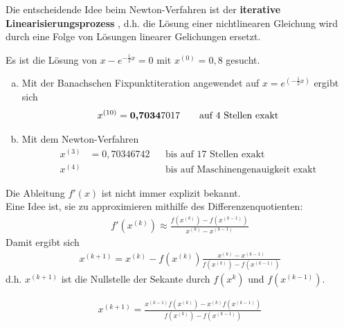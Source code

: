 Die entscheidende Idee beim Newton-Verfahren ist der \textbf{iterative Linearisierungsprozess}
, d.h. die Lösung einer nichtlinearen Gleichung wird
durch eine Folge von Lösungen linearer Gelichungen ersetzt.

\begin{Bspe}
  \label{5.4.6}
  Es ist die Lösung von $x-e^{-\frac{1}{2}x}=0$ mit $x^{(0)}=0,8$ gesucht.
  \begin{enumerate}[a)]
  \item Mit der Banachschen Fixpunktiteration angewendet auf 
    $x=e^{(-\frac{1}{2}x)}$ ergibt sich
    \begin{gather*}
      x^{(10)}=\text{\textbf{0,7034}}7017 
      \qquad \text{auf 4 Stellen exakt}
    \end{gather*}
  \item Mit dem Newton-Verfahren
    \begin{align*}
      x^{(3)}&= 0,70346742 &&\text{bis auf 17 Stellen exakt}\\
      x^{(4)} &&& \text{bis auf Maschinengenauigkeit exakt}
    \end{align*}		
  \end{enumerate}
\end{Bspe}
Die Ableitung $f'(x)$ ist nicht immer explizit bekannt. \\
Eine Idee ist, sie zu approximieren mithilfe des Differenzenquotienten:
\begin{gather*}
  f'(x^{(k)})  \approx \frac{f(x^{(k)})-f(x^{(k-1)})}{x^{(k)}-x^{(k-1)}}
\end{gather*}
Damit ergibt sich
\begin{gather*}
  x^{(k+1)} = x^{(k)}-f(x^{(k)}) \frac{x^{(k)} - x^{(k-1)}}{f(x^{(k)})-f(x^{(k-1)})}
\end{gather*}
d.h. $x^{(k+1)} $ ist die Nullstelle der Sekante durch $f(x^{k})$ und $f(x^{(k-1)})$.


\begin{gather}
  x^{(k+1)} = \frac{x^{(k-1)}f(x^{(k)}) - x^{(k)}f(x^{(k-1)})}{f(x^{(k)})-f(x^{(k-1)})}
  \label{V.4.2}
\end{gather}


